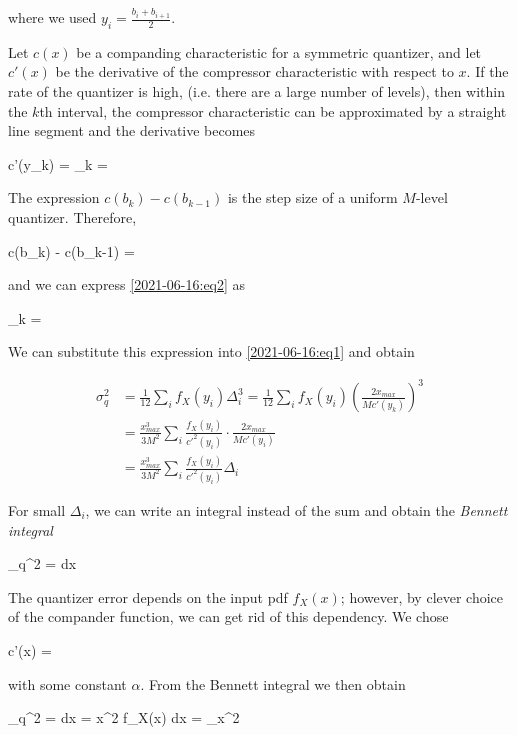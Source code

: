 where we used $y_i = \frac{b_i + b_{i+1}}{2}$. 

Let $c(x)$ be a companding characteristic for a symmetric quantizer, and let $c'(x)$ be the derivative of the compressor characteristic with respect to $x$. If the rate of the quantizer is high, (i.e. there are a large number of levels), then within the $k$th interval, the compressor characteristic can be approximated by a straight line segment and the derivative becomes

\be\label{2021-06-16:eq2}
c'(y_k) =  \rightarrow \Delta_k = 
\ee

The expression $c(b_k) - c(b_{k-1})$ is the step size of a uniform $M$-level quantizer. Therefore,

\bee
c(b_k) - c(b_{k-1}) = 
\eee

and we can express \eqref{2021-06-16:eq2} as

\bee
\Delta_k = 
\eee

We can substitute this expression into \eqref{2021-06-16:eq1} and obtain

\begin{align*}
  \sigma_q^2 &= \frac{1}{12} \sum_i f_X(y_i) \Delta_i^3 = \frac{1}{12} \sum_i f_X(y_i) \left( \frac{2x_{max}}{M c'(y_k)} \right)^3 \\
             &= \frac{x_{max}^3}{3M^2} \sum_i \frac{f_X(y_i)}{c'^2(y_i)} \cdot \frac{2x_{max}}{M c'(y_i)} \\
             &= \frac{x_{max}^3}{3M^2} \sum_i \frac{f_X(y_i)}{c'^2(y_i)} \Delta_i
\end{align*}

For small $\Delta_i$, we can write an integral instead of the sum and obtain the \emph{Bennett integral}

\bee
\sigma_q^2 =  \int {} dx
\eee

The quantizer error depends on the input pdf $f_X(x)$; however, by clever choice of the compander function, we can get rid of this dependency. We chose

\be\label{2021-06-16:eq3}
c'(x) = 
\ee

with some constant $\alpha$. From the Bennett integral we then obtain

\bee
\sigma_q^2 =  \int {} dx =   \int x^2 f_X(x) dx =  \sigma_x^2
\eee

